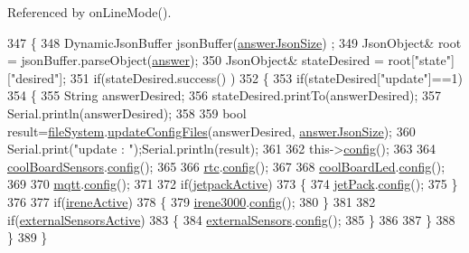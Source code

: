 Referenced by on\+Line\+Mode().


\begin{DoxyCode}
347 \{   
348     DynamicJsonBuffer  jsonBuffer(\hyperlink{classCoolBoard_af2da1f85315b3d074a8b87d158094fb7}{answerJsonSize}) ;
349     JsonObject& root = jsonBuffer.parseObject(\hyperlink{classCoolBoard_a7b835fafd449e5282f7f91d787a2dc15}{answer});
350     JsonObject& stateDesired = root[\textcolor{stringliteral}{"state"}][\textcolor{stringliteral}{"desired"}];
351     \textcolor{keywordflow}{if}(stateDesired.success() )
352     \{
353         \textcolor{keywordflow}{if}(stateDesired[\textcolor{stringliteral}{"update"}]==1) 
354             \{   
355                 String answerDesired;
356                 stateDesired.printTo(answerDesired);
357                 Serial.println(answerDesired);
358                 
359                 \textcolor{keywordtype}{bool} result=\hyperlink{classCoolBoard_a42c2586fbb13ff7f06538e9284e8538d}{fileSystem}.\hyperlink{classCoolFileSystem_a32dad79ae80182a83e2e8f52286b7c7b}{updateConfigFiles}(answerDesired,
      \hyperlink{classCoolBoard_af2da1f85315b3d074a8b87d158094fb7}{answerJsonSize}); 
360                 Serial.print(\textcolor{stringliteral}{"update : "});Serial.println(result);
361                 
362                 this->\hyperlink{classCoolBoard_a583a874c09c07e70a6eb9229fc4beddb}{config}();   
363         
364                 \hyperlink{classCoolBoard_af102be5288bd7f7a8e59b13f86e26a00}{coolBoardSensors}.\hyperlink{classCoolBoardSensors_a9a218895c5423375c33c08f2c56fb23a}{config}();
365 
366                 \hyperlink{classCoolBoard_a50d2a6716879d64a85f3c6b44ad63275}{rtc}.\hyperlink{classCoolTime_a87c28260c1bc77091162cbcf1ee2e129}{config}(); 
367 
368                 \hyperlink{classCoolBoard_a1b1d3c684a5baa56b08486e192fd8e97}{coolBoardLed}.\hyperlink{classCoolBoardLed_a1b60e5e30bea96c49ed62ed1bf1ffc8b}{config}();
369             
370                 \hyperlink{classCoolBoard_a2399f44d7c23c1149a335cb3b46d90f1}{mqtt}.\hyperlink{classCoolMQTT_a0158596b9a2297c8ba609b56ce6bace1}{config}();            
371                         
372                 \textcolor{keywordflow}{if}(\hyperlink{classCoolBoard_a4dc6ff276ed178975bd8b459fa7421dc}{jetpackActive})
373                 \{
374                     \hyperlink{classCoolBoard_a30b1357881b01ccbec676856a91e48e9}{jetPack}.\hyperlink{classJetpack_ab065ee83e244265a2223a22f3ee4a719}{config}(); 
375                 \}
376 
377                 \textcolor{keywordflow}{if}(\hyperlink{classCoolBoard_a1de9b5516695b2e1668bf2e3a6701332}{ireneActive})
378                 \{
379                     \hyperlink{classCoolBoard_ad103718ce316006c4695b8eb312eaf11}{irene3000}.\hyperlink{classIrene3000_afed5c35e4b23963c157847ef27c11e9c}{config}();  
380                 \}
381             
382                 \textcolor{keywordflow}{if}(\hyperlink{classCoolBoard_af29860cc422622dc33614f9eabb58c40}{externalSensorsActive})
383                 \{
384                     \hyperlink{classCoolBoard_a09e26264839c65873eb56af476eff6b2}{externalSensors}.\hyperlink{classExternalSensors_a862a4bd11346b37270d0244c2adabe5a}{config}();          
385                 \}
386 
387             \}
388     \}
389 \}
\end{DoxyCode}
